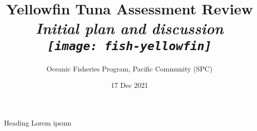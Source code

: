 \documentclass[aspectratio=169]{beamer}
\begin{document}
\begin{frame}
  \title{\centering\vspace{2ex}
    \Large Yellowfin Tuna Assessment Review\\[2ex]
    \large\it Initial plan and discussion\\[2ex]
    \texttt{[image: fish-yellowfin]}}
  \author{\centering\vspace{9ex}
    \scriptsize Oceanic Fisheries Program, Pacific Community (SPC)}
  \date{\centering\vspace{5ex}
    \scriptsize 17 Dec 2021}
  \titlepage
\end{frame}

\begin{frame}{Heading}
  Lorem ipsum
\end{frame}
\end{document}
